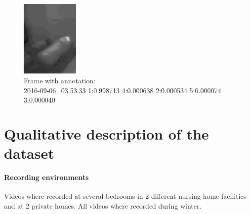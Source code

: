 \documentclass[oneside, twocolumn]{article}
\begin{document}
\begin{figure}
  \centering
    \includegraphics[width=0.25\textwidth]{images/image_with_annotation.png}
  \caption{Frame with annotation: \\2016-09-06\_03.53.33 1:0.998713 4:0.000638 2:0.000534 5:0.000074 3:0.000040}
  \label{fig:image_w_annotation}
\end{figure}

\section{Qualitative description of the dataset}
\label{sec:properties}
\paragraph{Recording environments}
Videos where recorded at several bedrooms in 2 different nursing home facilities and at 2 private homes. All videos
where recorded during winter.
\end{document}
